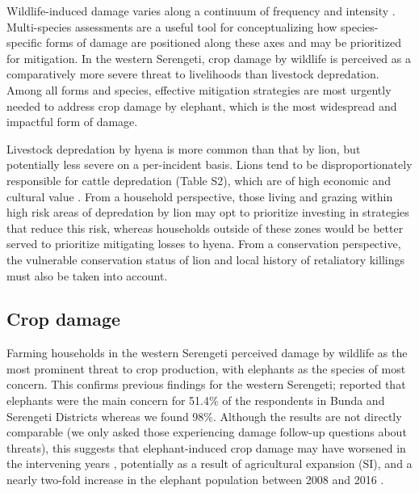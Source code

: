 \documentclass[12pt,]{article}
\begin{document}
Wildlife-induced damage varies along a continuum of frequency and intensity \citep{Nyhus2016}. Multi-species assessments are a useful tool for conceptualizing how species-specific forms of damage are positioned along these axes and may be prioritized for mitigation. In the western Serengeti, crop damage by wildlife is perceived as a comparatively more severe threat to livelihoods than livestock depredation. Among all forms and species, effective mitigation strategies are most urgently needed to address crop damage by elephant, which is the most widespread and impactful form of damage. 

Livestock depredation by hyena is more common than that by lion, but potentially less severe on a per-incident basis. Lions tend to be disproportionately responsible for cattle depredation (Table S2), which are of high economic and cultural value \citep{Kolowski2006, Kissui2008}. From a household perspective, those living and grazing within high risk areas of depredation by lion may opt to prioritize investing in strategies that reduce this risk, whereas households outside of these zones would be better served to prioritize mitigating losses to hyena. From a conservation perspective, the vulnerable conservation status of lion \citep{bauer2016panthera} and local history of retaliatory killings must also be taken into account. 

\subsection{Crop damage}

Farming households in the western Serengeti perceived damage by wildlife as the most prominent threat to crop production, with elephants as the species of most concern. This confirms previous findings for the western Serengeti; \cite{mfunda2011wildlife} reported that elephants were the main concern for 51.4\% of the respondents in Bunda and Serengeti Districts whereas we found 98\%. Although the results are not directly comparable (we only asked those experiencing damage follow-up questions about threats), this suggests that elephant-induced crop damage may have worsened in the intervening years \citep{DenningerSnyder2019}, potentially as a result of agricultural expansion (SI), and a nearly two-fold increase in the elephant population between 2008 and 2016 \citep{Goodman2018}. 
\end{document}
